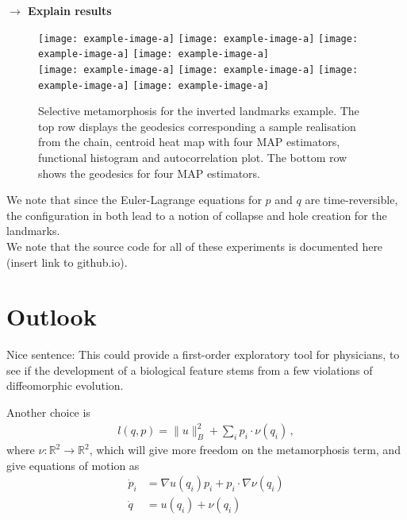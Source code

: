 \documentclass[runningheads]{llncs}
\begin{document}
\textbf{$\longrightarrow$ Explain results}\\

\begin{figure}
\centering
\begin{minipage}{\textwidth}
  \centering
    \texttt{[image: example-image-a]}\quad
    \texttt{[image: example-image-a]}\quad
    \texttt{[image: example-image-a]}\quad
    \texttt{[image: example-image-a]}\\[0.25cm]
    \texttt{[image: example-image-a]}\quad
    \texttt{[image: example-image-a]}\quad
    \texttt{[image: example-image-a]}\quad
    \texttt{[image: example-image-a]}
    \caption{Selective metamorphosis for the inverted landmarks example. The top
    row displays the geodesics corresponding a sample realisation from the
    chain, centroid heat map with four MAP estimators, functional histogram and
    autocorrelation plot. The bottom row shows the geodesics for four MAP
    estimators.}
    \label{fig:selective:triangle}
\end{minipage}
\end{figure}

We note that since the Euler-Lagrange equations for $p$ and $q$ are
time-reversible, the configuration in both lead to a notion of
collapse and hole creation for the landmarks.\\



We note that the source code for all of these experiments is documented
here (insert link to github.io). 

\section{Outlook}\label{sec:outlook}

{\color{red} Nice sentence:} {\color{blue} This could provide a
first-order exploratory tool for physicians, to see if the development of a
biological feature stems from a few violations of diffeomorphic evolution.}


Another choice is 
\begin{align}
    l(q,p) = \|u\|_B^2 + \sum_i p_i\cdot \nu(q_i) \, , 
\end{align}
where $\nu:\mathbb R^2 \to \mathbb R^2$, which will give more freedom on the
metamorphosis term, and give equations of motion as \begin{align}
    \dot p_i  &= \nabla u(q_i)p_i  + p_i \cdot \nabla \nu(q_i)\\
    \dot q &= u(q_i) + \nu(q_i) 
\end{align}
\end{document}
